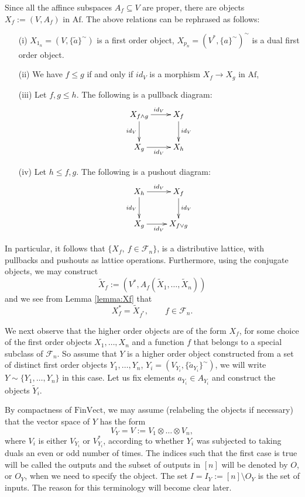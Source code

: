 \documentclass[12pt]{article}
\theoremstyle{definition}
\theoremstyle{remark}
\def\Fe{\mathcal F}
\def \Af{\mathrm{Af}}
\def \FV{\mathrm{FinVect}}
\begin{document}
Since all the affince subspaces  $A_f\subseteq V$ are proper, there are objects $X_f:=(V,A_f)$ in $\Af$. The
above relations can be rephrased as follows:
\begin{enumerate}
\item[(i)] $X_{1_n}=(V,\{\tilde a\}^\sim)$ is a first order object,
$X_{p_n}=(V^*,\{a\}^\sim)^\sim$ is a dual first order object.
\item[(ii)] We have $f\le g$ if and only if $id_V$ is a morphism $X_f\to X_g$ in $\Af$,
\item[(iii)] Let $f,g\le h$. The following is a pullback diagram:
\[
\xymatrix{
X_{f\wedge g}\ar[r]^{id_V}
\ar[d]_{id_V} & X_f\ar[d]^{id_V} \\
X_{g} \ar[r]_{id_V}& X_{h} 
}
\]

\item[(iv)] Let $h\le f,g$. The following is a pushout diagram:
\[
\xymatrix{
X_{h}\ar[r]^{id_V}
\ar[d]_{id_V} & X_f\ar[d]^{id_V} \\
X_{g} \ar[r]_{id_V}& X_{f\vee g} 
}
\]


\end{enumerate}
In particular, it follows that $\{X_f,\ f\in \Fe_n\}$, is a distributive lattice, with
pullbacks and pushouts as lattice operations. Furthermore, using the conjugate objects, we
may construct 
\[
\tilde X_f:=(V^*, A_f(\tilde X_1,\dots,\tilde X_n))
\]
and we see from Lemma
\ref{lemma:Xf} that 
\begin{equation}\label{eq:dualityXf}
X_f^*=\tilde X_{f^*},\qquad f\in \Fe_n.
\end{equation}



We next observe that the higher order objects are of the form $X_f$, for some choice of the
first order objects $X_1,\dots, X_n$ and a function $f$ that belongs to a special subclass of $\Fe_n$.  
So assume that  $Y$ is a higher order object constructed from a set of distinct first
order objects $Y_1,\dots, Y_n$, $Y_i=(V_{Y_i},\{\tilde a_{Y_i}\}^\sim)$, we will write
$Y\sim\{Y_1,\dots,Y_n\}$ in this case. Let us fix elements $a_{Y_i}\in A_{Y_i}$ and construct the objects $\tilde Y_i$. 
 
 By compactness of $\FV$, we may assume (relabeling the objects if necessary) that the vector space of $Y$ has the form
\[
V_Y=V:=V_{1}\otimes \dots\otimes V_{n},
\]
where  $V_i$ is either $V_{Y_i}$ or $V_{Y_i}^*$, according to whether $Y_i$ was subjected
to taking duals an even or odd number of times. The indices such that the first
case is true will be called the outputs and the subset of outputs in $[n]$ will be denoted
by $O$, or $O_Y$, when we need to specify the object. The set $I=I_Y:=[n]\setminus O_Y$ is
the set of inputs. The reason for this terminology will become clear later. 
\end{document}
